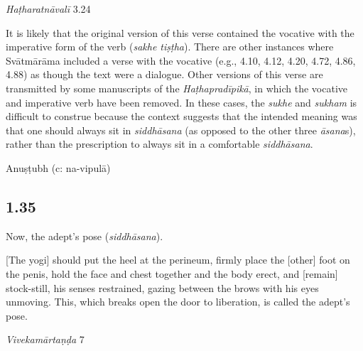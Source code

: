 \begin{ekdosis}
\begin{testimonia}[hp01_034]
\emph{Haṭharatnāvalī} 3.24

\begin{versinnote}
\tl{\var{tathā ] satve P, sakhe T,t1}\\!}
\end{versinnote}

\end{testimonia}

\begin{philcomm}[hp01_034]
It is likely that the original version of this verse contained the vocative with the imperative form of the verb (\emph{sakhe tiṣṭha}). There are other instances where Svātmārāma included a verse with the vocative (e.g., 4.10, 4.12, 4.20, 4.72, 4.86, 4.88) as though the text were a dialogue. Other versions of this verse are transmitted by some manuscripts of the \emph{Haṭhapradīpikā}, in which the vocative and imperative verb have been removed. In these cases, the \emph{sukhe} and \emph{sukham} is difficult to construe because the context suggests that the intended meaning was that one should always sit in \emph{siddhāsana} (as opposed to the other three \emph{āsana}s), rather than the prescription to always sit in a comfortable \emph{siddhāsana}.   
\end{philcomm}

\begin{metre}[hp01_034]
Anuṣṭubh (c: na-vipulā)
\end{metre}

\subsection*{1.35}
\begin{translation}[hp01_035]
Now, the adept's pose (\emph{siddhāsana}).

[The yogi] should put the heel at the perineum, firmly place the [other] foot on the penis, hold the face and chest together and the body erect, and [remain] stock-still, his senses restrained, gazing between the brows with his eyes unmoving. This, which breaks open the door to liberation, is called the adept’s pose.
\end{translation}

\begin{sources}[hp01_035]
\emph{Vivekamārtaṇḍa} 7


\end{sources}
\end{ekdosis}
